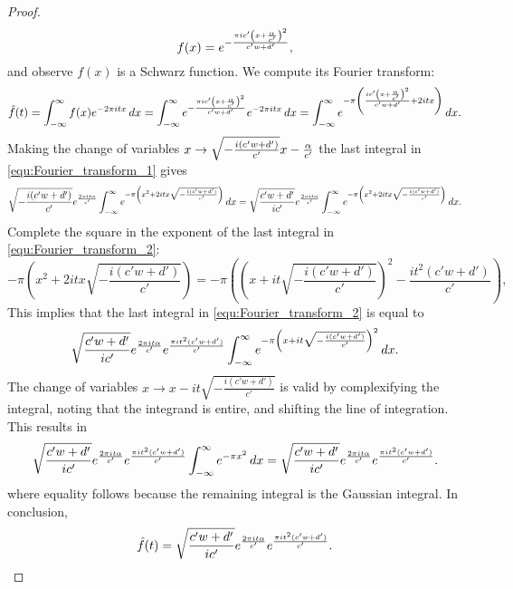 \documentclass[12pt,reqno,oneside]{amsart}
\begin{document}
\begin{proof}
        \[
            f(x) = e^{-\frac{\pi ic'\left(x+\frac{\alpha}{c'}\right)^{2}}{c'w+d'}},
        \]
        and observe $f(x)$ is a Schwarz function. We compute its Fourier transform:
        \begin{equation}\label{equ:Fourier_transform_1}
            \hat{f}(t) = \int_{-\infty}^{\infty}f(x)e^{-2\pi itx}\,dx = \int_{-\infty}^{\infty}e^{-\frac{\pi ic'\left(x+\frac{\alpha}{c'}\right)^{2}}{c'w+d'}}e^{-2\pi itx}\,dx = \int_{-\infty}^{\infty}e^{-\pi\left(\frac{ic'\left(x+\frac{\alpha}{c'}\right)^{2}}{c'w+d'}+2itx\right)}\,dx.
        \end{equation}
        Making the change of variables $x \to \sqrt{-\frac{i(c'w+d')}{c'}}x-\frac{\alpha}{c'}$ the last integral in \cref{equ:Fourier_transform_1} gives
        \begin{equation}\label{equ:Fourier_transform_2}
            \sqrt{-\frac{i(c'w+d')}{c'}}e^{\frac{2\pi i t\alpha}{c'}}\int_{-\infty}^{\infty}e^{-\pi\left(x^{2}+2itx\sqrt{-\frac{i(c'w+d')}{c'}}\right)}\,dx = \sqrt{\frac{c'w+d'}{ic'}}e^{\frac{2\pi i t\alpha}{c'}}\int_{-\infty}^{\infty}e^{-\pi\left(x^{2}+2itx\sqrt{-\frac{i(c'w+d')}{c'}}\right)}\,dx.
        \end{equation}
        Complete the square in the exponent of the last integral in \cref{equ:Fourier_transform_2}:
        \[
            -\pi\left(x^{2}+2itx\sqrt{-\frac{i(c'w+d')}{c'}}\right) = -\pi\left(\left(x+it\sqrt{-\frac{i(c'w+d')}{c'}}\right)^{2}-\frac{it^{2}(c'w+d')}{c'}\right),
        \]
        This implies that the last integral in \cref{equ:Fourier_transform_2} is equal to
        \[
            \sqrt{\frac{c'w+d'}{ic'}}e^{\frac{2\pi i t\alpha}{c'}}e^{\frac{\pi it^{2}(c'w+d')}{c'}}\int_{-\infty}^{\infty}e^{-\pi\left(x+it\sqrt{-\frac{i(c'w+d')}{c'}}\right)^{2}}\,dx.
        \]
        The change of variables $x \to x-it\sqrt{-\frac{i(c'w+d')}{c'}}$ is valid by complexifying the integral, noting that the integrand is entire, and shifting the line of integration. This results in
        \[
            \sqrt{\frac{c'w+d'}{ic'}}e^{\frac{2\pi i t\alpha}{c'}}e^{\frac{\pi it^{2}(c'w+d')}{c'}}\int_{-\infty}^{\infty}e^{-\pi x^{2}}\,dx = \sqrt{\frac{c'w+d'}{ic'}}e^{\frac{2\pi i t\alpha}{c'}}e^{\frac{\pi it^{2}(c'w+d')}{c'}}.
        \]
        where equality follows because the remaining integral is the Gaussian integral. In conclusion,
        \begin{equation}\label{equ:Fourier_transform_result}
            \hat{f}(t) = \sqrt{\frac{c'w+d'}{ic'}}e^{\frac{2\pi i t\alpha}{c'}}e^{\frac{\pi it^{2}(c'w+d')}{c'}}.
        \end{equation}

\end{proof}
\end{document}
